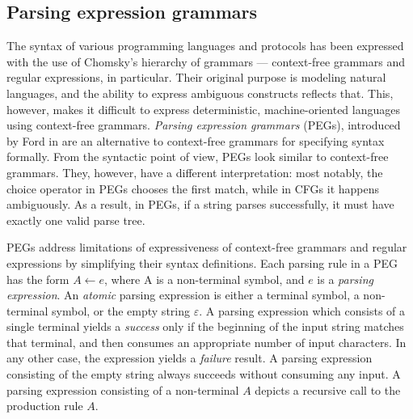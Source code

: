 \documentclass[english,bachelors,forcepolishlogotype]{wizthesis}
\begin{document}
\subsection{Parsing expression grammars} \label{sbs:pegs}

The syntax of various programming languages and protocols has been expressed
with the use of Chomsky's hierarchy of grammars --- context-free grammars and
regular expressions, in particular. Their original purpose is modeling natural
languages, and the ability to express ambiguous constructs reflects that. This,
however, makes it difficult to express deterministic, machine-oriented languages
using context-free grammars. \emph{Parsing expression grammars} (PEGs),
introduced by Ford in \cite{ford-2004} are an alternative to context-free
grammars for specifying syntax formally. From the syntactic point of view, PEGs
look similar to context-free grammars. They, however, have a different
interpretation: most notably, the choice operator in PEGs chooses the first
match, while in CFGs it happens ambiguously. As a result, in PEGs, if a string
parses successfully, it must have exactly one valid parse tree.

PEGs address limitations of expressiveness of context-free grammars and regular
expressions by simplifying their syntax definitions. Each parsing rule in a PEG
has the form $A \leftarrow e$, where A is a non-terminal symbol, and $e$ is a
\emph{parsing expression}. An \emph{atomic} parsing expression is either a
terminal symbol, a non-terminal symbol, or the empty string $\varepsilon$. A
parsing expression which consists of a single terminal yields a \emph{success}
only if the beginning of the input string matches that terminal, and then
consumes an appropriate number of input characters. In any other case, the
expression yields a \emph{failure} result. A parsing expression consisting of
the empty string always succeeds without consuming any input. A parsing
expression consisting of a non-terminal $A$ depicts a recursive call to the
production rule $A$.
\end{document}
